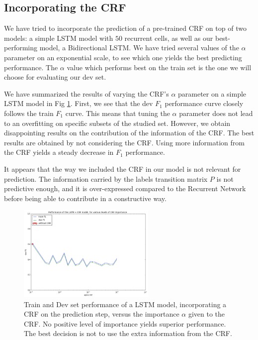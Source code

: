 \documentclass{article} %
\begin{document}
\subsection{Incorporating the CRF}

We have tried to incorporate the prediction of a pre-trained CRF on top of two models: a simple LSTM model with $50$ recurrent cells, as well as our best-performing model, a Bidirectional LSTM. We have tried several values of the $\alpha$ parameter on an exponential scale, to see which one yields the best predicting performance. The $\alpha$ value which performs best on the train set is the one we will choose for evaluating our dev set.

We have summarized the results of varying the CRF's $\alpha$ parameter on a simple LSTM model in Fig \ref{lstm-crf-results}. First, we see that the dev $F_1$ performance curve closely follows the  train $F_1$ curve. This means that tuning the $\alpha$ parameter does not lead to an overfitting on specific subsets of the studied set. However, we obtain disappointing results on the contribution of the information of the CRF. The best results are obtained by not considering the CRF. Using more information from the CRF yields a steady decrease in $F_1$ performance.

It appears that the way we included the CRF in our model is not relevant for prediction. The information carried by the labels transition matrix $P$ is not predictive enough, and it is over-expressed compared to the Recurrent Network before being able to contribute in a constructive way.

\begin{figure}[h!]
\begin{center}
\includegraphics[width=250px]{figs/LSTM-CRF-vs-alpha.png}
\caption{Train and Dev set performance of a LSTM model, incorporating a CRF on the prediction step, versus the importance $\alpha$ given to the CRF. No positive level of importance yields superior performance. The best decision is not to use the extra information from the CRF. }
\label{lstm-crf-results}
\end{center}
\end{figure}
\end{document}
